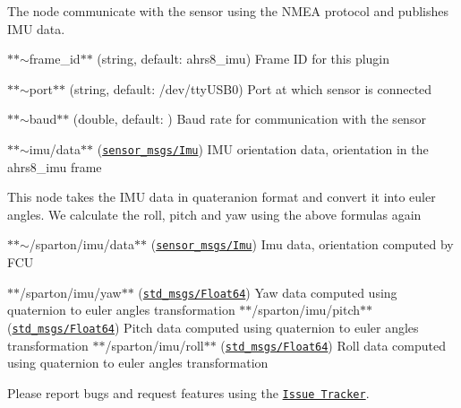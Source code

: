The node communicate with the sensor using the N\+M\+EA protocol and publishes I\+MU data.


\begin{DoxyItemize}
\item $\ast$$\ast${\ttfamily $\sim$frame\+\_\+id}$\ast$$\ast$ (string, default\+: {\ttfamily ahrs8\+\_\+imu}) Frame ID for this plugin
\item $\ast$$\ast${\ttfamily $\sim$port}$\ast$$\ast$ (string, default\+: {\ttfamily /dev/tty\+U\+S\+B0}) Port at which sensor is connected
\item $\ast$$\ast${\ttfamily $\sim$baud}$\ast$$\ast$ (double, default\+: {}) Baud rate for communication with the sensor
\end{DoxyItemize}


\begin{DoxyItemize}
\item $\ast$$\ast${\ttfamily $\sim$imu/data}$\ast$$\ast$ (\href{http://docs.ros.org/api/sensor_msgs/html/msg/Imu.html}{\tt sensor\+\_\+msgs/\+Imu}) I\+MU orientation data, orientation in the {\ttfamily ahrs8\+\_\+imu} frame
\end{DoxyItemize}

This node takes the I\+MU data in quateranion format and convert it into euler angles. We calculate the roll, pitch and yaw using the above formulas again


\begin{DoxyItemize}
\item $\ast$$\ast${\ttfamily $\sim$/sparton/imu/data}$\ast$$\ast$ (\href{http://docs.ros.org/api/sensor_msgs/html/msg/Imu.html}{\tt sensor\+\_\+msgs/\+Imu}) Imu data, orientation computed by F\+CU
\end{DoxyItemize}


\begin{DoxyItemize}
\item $\ast$$\ast${\ttfamily /sparton/imu/yaw}$\ast$$\ast$ (\href{http://docs.ros.org/lunar/api/std_msgs/html/msg/Float64.html}{\tt std\+\_\+msgs/\+Float64}) Yaw data computed using quaternion to euler angles transformation $\ast$$\ast${\ttfamily /sparton/imu/pitch}$\ast$$\ast$ (\href{http://docs.ros.org/lunar/api/std_msgs/html/msg/Float64.html}{\tt std\+\_\+msgs/\+Float64}) Pitch data computed using quaternion to euler angles transformation $\ast$$\ast${\ttfamily /sparton/imu/roll}$\ast$$\ast$ (\href{http://docs.ros.org/lunar/api/std_msgs/html/msg/Float64.html}{\tt std\+\_\+msgs/\+Float64}) Roll data computed using quaternion to euler angles transformation
\end{DoxyItemize}

Please report bugs and request features using the \href{https://github.com/AUV-IITK/fourtran/issues}{\tt Issue Tracker}. 